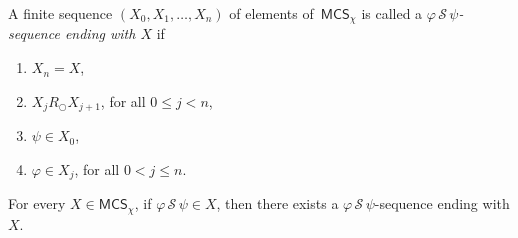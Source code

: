 \documentclass[envcountsect,envcountsame,oribibl,orivec]{llncs}
\newcommand{\lnext}{\bigcirc}
\newcommand{\lsince}{{\,\mathcal{S}\,}}
\renewcommand{\phi}{\varphi}
\newcommand{\MCS}{\mathsf{MCS}}
\begin{document}
\begin{definition}
	A finite sequence $(X_0, X_1, \ldots, X_n)$ of elements of~$\MCS_\chi$ is called a \emph{$\phi \lsince \psi$-sequence ending with $X$} if
	\begin{enumerate}
		\item $X_n = X$,
		
		\item $X_j R_\lnext X_{j+1}$, for all $0 \leq j < n$, 
		
		\item $\psi \in X_0$,
		
		\item $\phi \in X_j$, for all $0< j \leq n$.
	\end{enumerate}
\end{definition}


\begin{lemma}\label{lem:since-sequence}
	For every $X \in \MCS_\chi$, if $\phi \lsince \psi \in X$, then there exists a  $\phi \lsince \psi$-sequence ending with $X$.
\end{lemma}
\end{document}
